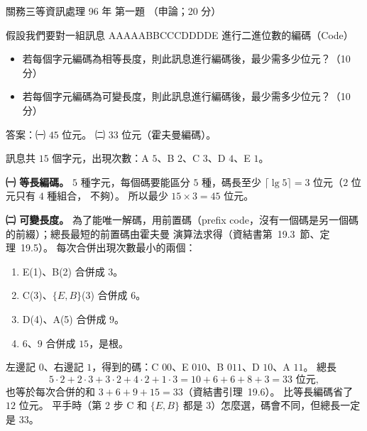 \begin{pastexam}[label={px:gw3-096-ds-01}]{關務三等資訊處理 96 年 第一題}
（申論；20 分）

假設我們要對一組訊息 AAAAABBCCCDDDDE 進行二進位數的編碼（Code）
\begin{itemize}[leftmargin=2.2em, nosep]
\item[㈠] 若每個字元編碼為相等長度，則此訊息進行編碼後，最少需多少位元？（10 分）
\item[㈡] 若每個字元編碼為可變長度，則此訊息進行編碼後，最少需多少位元？（10 分）
\end{itemize}
\end{pastexam}

\begin{pastsoln}
答案：㈠ $45$ 位元。 ㈡ $33$ 位元（霍夫曼編碼）。

訊息共 $15$ 個字元，出現次數：A $5$、B $2$、C $3$、D $4$、E $1$。

\textbf{㈠ 等長編碼。} $5$ 種字元，每個碼要能區分 $5$ 種，碼長至少 $\lceil \lg 5 \rceil = 3$ 位元（$2$ 位元只有 $4$ 種組合，
不夠）。 所以最少 $15 \times 3 = 45$ 位元。

\textbf{㈡ 可變長度。} 為了能唯一解碼，用前置碼（prefix code，沒有一個碼是另一個碼的前綴）；總長最短的前置碼由霍夫曼
演算法求得（資結書第~19.3~節、定理~19.5）。 每次合併出現次數最小的兩個：
\begin{enumerate}
\item E(1)、B(2) 合併成 $3$。
\item C(3)、$\{E,B\}$(3) 合併成 $6$。
\item D(4)、A(5) 合併成 $9$。
\item $6$、$9$ 合併成 $15$，是根。
\end{enumerate}
\begin{center}
\end{center}
左邊記 $0$、右邊記 $1$，得到的碼：C $00$、E $010$、B $011$、D $10$、A $11$。 總長
\[
5 \cdot 2 + 2 \cdot 3 + 3 \cdot 2 + 4 \cdot 2 + 1 \cdot 3 = 10 + 6 + 6 + 8 + 3 = 33 \text{ 位元},
\]
也等於每次合併的和 $3 + 6 + 9 + 15 = 33$（資結書引理~19.6）。 比等長編碼省了 $12$ 位元。 平手時（第 2 步 C 和
$\{E,B\}$ 都是 $3$）怎麼選，碼會不同，但總長一定是 $33$。
\end{pastsoln}
